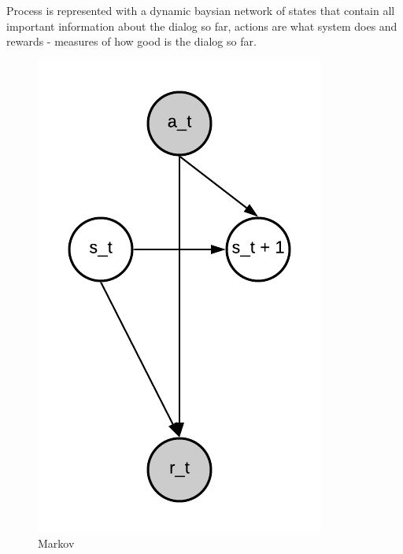 \documentclass[12pt,titlepage,a4paper]{article}
\begin{document}
Process is represented with a dynamic baysian network of states that contain all important information about the dialog so far, actions are what system does and rewards - measures of how good is the dialog so far.

\begin{figure}[!htb]
      \includegraphics[width=\linewidth]{markov.png}
      \caption{Markov}
    \endminipage\hfill

\end{figure}
\end{document}
